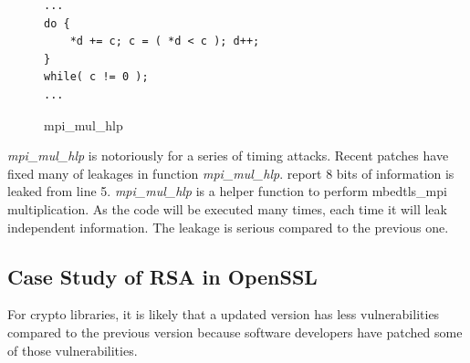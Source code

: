 \begin{figure}[h!]
    \centering
\begin{lstlisting}[xleftmargin=.02\textwidth,xrightmargin=.01\textwidth]
...
do {
    *d += c; c = ( *d < c ); d++;
}
while( c != 0 );
...
\end{lstlisting}
\caption{mpi\_mul\_hlp}
\label{mbedtls_rsa_2}
\end{figure}

\emph{mpi\_mul\_hlp} is notoriously for a series of timing attacks. Recent 
patches have fixed many of leakages in function \emph{mpi\_mul\_hlp}.
\tool{} report 8 bits of information is leaked from line 5. 
\emph{mpi\_mul\_hlp} is a helper function to perform
mbedtls\_mpi multiplication. As the code will be executed many times,
each time it will leak independent information. The leakage is serious 
compared to the previous one.

\subsection{Case Study of RSA in OpenSSL}
For crypto libraries, it is likely that a updated version has less vulnerabilities
compared to the previous version because software developers have patched some
of those vulnerabilities.  

